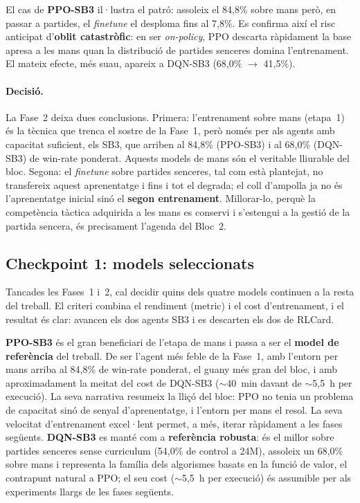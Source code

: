 El cas de \textbf{PPO-SB3} il·lustra el patró: assoleix el 84{,}8\% sobre mans però, en
passar a partides, el \emph{finetune} el desploma fins al 7{,}8\%. Es confirma així el risc
anticipat d'\textbf{oblit catastròfic}: en ser \emph{on-policy}, PPO descarta ràpidament la
base apresa a les mans quan la distribució de partides senceres domina l'entrenament. El
mateix efecte, més suau, apareix a DQN-SB3 (68{,}0\% $\rightarrow$ 41{,}5\%).

\paragraph{Decisió.} La Fase~2 deixa dues conclusions. Primera: l'entrenament sobre mans
(etapa~1) és la tècnica que trenca el sostre de la Fase~1, però només per als agents amb
capacitat suficient, els \ac{SB3}, que arriben al 84{,}8\% (PPO-SB3) i al 68{,}0\% (DQN-SB3)
de win-rate ponderat. Aquests models de mans són el veritable lliurable del bloc. Segona: el
\emph{finetune} sobre partides senceres, tal com està plantejat, no transfereix aquest
aprenentatge i fins i tot el degrada; el coll d'ampolla ja no és l'aprenentatge inicial sinó
el \textbf{segon entrenament}. Millorar-lo, perquè la competència tàctica adquirida a les
mans es conservi i s'estengui a la gestió de la partida sencera, és precisament l'agenda del
Bloc~2.

\subsection{Checkpoint 1: models seleccionats}
\label{sec:checkpoint1}

Tancades les Fases~1 i~2, cal decidir quins dels quatre models continuen a la resta del
treball. El criteri combina el rendiment (\(\text{metric}\)) i el cost d'entrenament, i el
resultat és clar: avancen els dos agents \ac{SB3} i es descarten els dos de RLCard.

\textbf{PPO-SB3} és el gran beneficiari de l'etapa de mans i passa a ser el \textbf{model de
referència} del treball. De ser l'agent més feble de la Fase~1, amb l'entorn per mans arriba al
84{,}8\% de win-rate ponderat, el guany més gran del bloc, i amb aproximadament la meitat del
cost de DQN-SB3 ($\sim$40~min davant de $\sim$5,5~h per execució). La seva narrativa resumeix
la lliçó del bloc: PPO no tenia un problema de capacitat sinó de senyal d'aprenentatge, i
l'entorn per mans el resol. La seva velocitat d'entrenament excel·lent permet, a més, iterar
ràpidament a les fases següents. \textbf{DQN-SB3} es manté com a \textbf{referència robusta}: és el
millor sobre partides senceres sense curriculum (54,0\% de control a 24M), assoleix un
68,0\% sobre mans i representa la família dels algorismes basats en la funció de valor, el
contrapunt natural a PPO; el seu cost ($\sim$5,5~h per execució) és assumible per als
experiments llargs de les fases següents.

